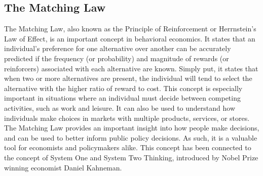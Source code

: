 \subsection{The Matching Law}

The Matching Law, also known as the Principle of Reinforcement or Herrnstein's Law of Effect, is an important concept in behavioral economics. 
It states that an individual's preference for one alternative over another can be accurately predicted if the frequency (or probability) and magnitude of rewards (or reinforcers) associated with each alternative are known. 
Simply put, it states that when two or more alternatives are present, the individual will tend to select the alternative with the higher ratio of reward to cost. 
This concept is especially important in situations where an individual must decide between competing activities, such as work and leisure. 
It can also be used to understand how individuals make choices in markets with multiple products, services, or stores. 
The Matching Law provides an important insight into how people make decisions, and can be used to better inform public policy decisions. As such, it is a valuable tool for economists and policymakers alike. 
\cite{Poling2011Apr}
This concept has been connected to the concept of System One and System Two Thinking,
introduced by Nobel Prize winning economist Daniel Kahneman.